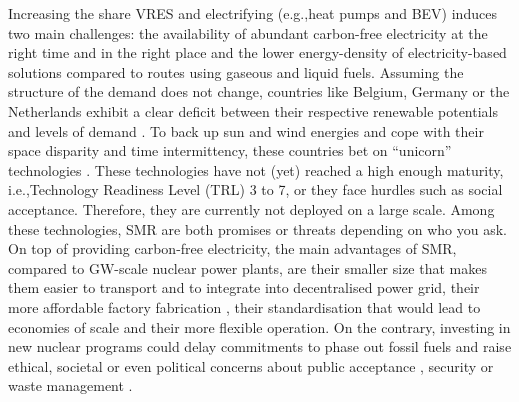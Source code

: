 \documentclass[11pt,twoside,a4paper,english]{article}
\def\eg{e.g.,}
\def\ie{i.e.,}
\begin{document}
Increasing the share \gls{VRES} and electrifying (\eg heat pumps and \gls{BEV}) induces two main challenges: the availability of abundant carbon-free electricity at the right time and in the right place and the lower energy-density of electricity-based solutions compared to routes using gaseous and liquid fuels. Assuming the structure of the demand does not change, countries like Belgium, Germany or the Netherlands exhibit a clear deficit between their respective renewable potentials and levels of demand \cite{thiran2024exploring}. To back up sun and wind energies and cope with their space disparity and time intermittency, these countries bet on ``unicorn'' technologies \cite{heuberger2018impact}. These technologies have not (yet) reached a high enough maturity, \ie Technology Readiness Level (TRL) 3 to 7, or they face hurdles such as social acceptance. Therefore, they are currently not deployed on a large scale. Among these technologies, \gls{SMR} are both promises \cite{lloyd2021transport} or threats \cite{kempf2022} depending on who you ask. On top of providing carbon-free electricity, the main advantages of \gls{SMR}, compared to GW-scale nuclear power plants, are their smaller size that makes them easier to transport and to integrate into decentralised power grid,  their more affordable factory fabrication \cite{abdulla2013expert}, their standardisation that would lead to economies of scale \cite{schmidt2016anticipating,grubler2010costs,carelli2010economic} and their more flexible operation.  On the contrary, investing in new nuclear programs could delay commitments to phase out fossil fuels and raise ethical, societal or even political concerns about public acceptance \cite{ansolabehere2009public,kim2014international}, security or waste management \cite{lovins2017origins,ewing2009nuclear}.
\end{document}
